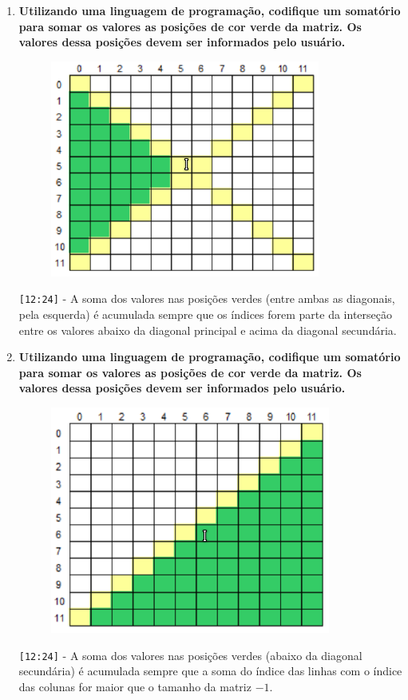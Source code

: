 \begin{enumerate}
	\pagebreak
	\item \textbf{Utilizando uma linguagem de programação, codifique um somatório para somar os valores as posições de cor verde da matriz. Os valores dessa posições devem ser informados pelo usuário.}
	\begin{figure}[H]
		\centering
		\includegraphics{7_7}
	\end{figure}
	
	\verb|[12:24]| - A soma dos valores nas posições verdes (entre ambas as diagonais, pela esquerda) é acumulada sempre que os índices forem parte da interseção entre os valores abaixo da diagonal principal e acima da diagonal secundária.
	
	\pagebreak
	\item \textbf{Utilizando uma linguagem de programação, codifique um somatório para somar os valores as posições de cor verde da matriz. Os valores dessa posições devem ser informados pelo usuário.}
	\begin{figure}[H]
		\centering
		\includegraphics{7_8}
	\end{figure}
	
	\verb|[12:24]| - A soma dos valores nas posições verdes (abaixo da diagonal secundária) é acumulada sempre que a soma do índice das linhas com o índice das colunas for maior que o tamanho da matriz $-1$.
	
\end{enumerate}